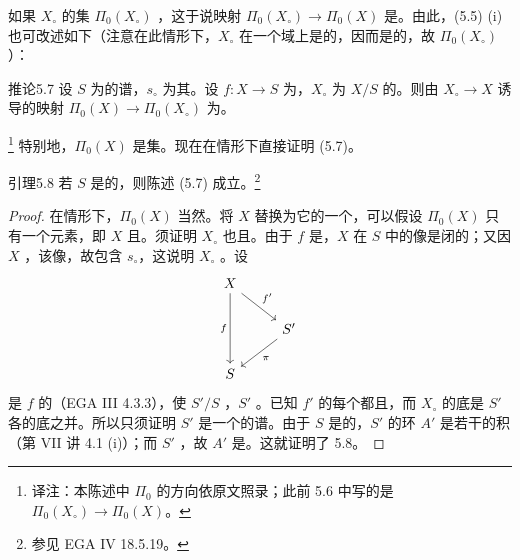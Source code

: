 如果 $X_\circ$ 的集 $\Pi_0(X_\circ)$ ，这于说映射 $\Pi_0(X_\circ)\to\Pi_0(X)$ 是。由此，(5.5) (i) 也可改述如下（注意在此情形下，$X_\circ$ 在一个域上是的，因而是的，故 $\Pi_0(X_\circ)$ ）：
\begin{SGAresult}{推论}{5.7}
设 $S$ 为的谱，$s_\circ$ 为其。设 $f:X\to S$ 为，$X_\circ$ 为 $X/S$ 的。则由 $X_\circ\to X$ 诱导的映射 $\Pi_0(X)\to\Pi_0(X_\circ)$ 为。
\end{SGAresult}
\footnote{译注：本陈述中 $\Pi_0$ 的方向依原文照录；此前 5.6 中写的是 $\Pi_0(X_\circ)\to\Pi_0(X)$。}
特别地，$\Pi_0(X)$ 是集。现在在情形下直接证明 (5.7)。
\begin{SGAresult}{引理}{5.8}
若 $S$ 是的，则陈述 (5.7) 成立。\footnote{参见 EGA IV 18.5.19。}
\end{SGAresult}
\begin{proof}
在情形下，$\Pi_0(X)$ 当然。将 $X$ 替换为它的一个，可以假设 $\Pi_0(X)$ 只有一个元素，即 $X$ 且。须证明 $X_\circ$ 也且。由于 $f$ 是，$X$ 在 $S$ 中的像是闭的；又因 $X$ ，该像，故包含 $s_\circ$，这说明 $X_\circ$ 。设
\[
\begin{tikzcd}
X\arrow[dr,"f'"]\arrow[dd,"f"']&\\
&S'\arrow[dl,"\pi"]\\
S&
\end{tikzcd}
\]
是 $f$ 的（EGA III 4.3.3），使 $S'/S$ ，$S'$ 。已知 $f'$ 的每个都且，而 $X_\circ$ 的底是 $S'$ 各的底之并。所以只须证明 $S'$ 是一个的谱。由于 $S$ 是的，$S'$ 的环 $A'$ 是若干的积（第 VII 讲 4.1 (i)）；而 $S'$ ，故 $A'$ 是。这就证明了 5.8。
\end{proof}

